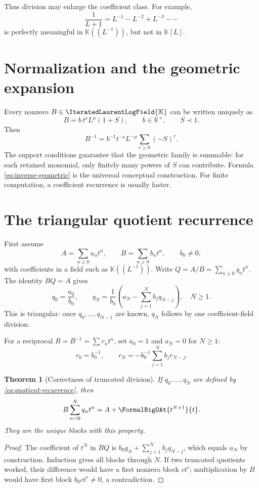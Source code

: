 \documentclass[11pt,oneside]{book}
\newtheorem{theorem}{Theorem}[chapter]
\theoremstyle{definition}
\theoremstyle{remark}
\newcommand{\K}{\mathbb K}
\newcommand{\PLfield}{\IteratedLaurentLogField{\K}}
\newcommand{\precdom}{\prec}
\begin{document}
Thus division may enlarge the coefficient class.  For example,
\[
 \frac1{L+1}=L^{-1}-L^{-2}+L^{-3}-\cdots
\]
is perfectly meaningful in $\K((L^{-1}))$, but not in $\K[L]$.

\section{Normalization and the geometric expansion}
Every nonzero $B\in\PLfield$ can be written uniquely as
\begin{equation}\label{eq:division-normalization}
 B=b\,t^\nu L^\mu(1+S),
 \qquad b\in\K^\times,
 \qquad S\precdom1.
\end{equation}
Then
\begin{equation}\label{eq:inverse-geometric}
 B^{-1}=b^{-1}t^{-\nu}L^{-\mu}
 \sum_{r\ge0}(-S)^r.
\end{equation}
The support conditions guarantee that the geometric family is summable: for
each retained monomial, only finitely many powers of $S$ can contribute.
Formula \eqref{eq:inverse-geometric} is the universal conceptual construction.
For finite computation, a coefficient recurrence is usually faster.

\section{The triangular quotient recurrence}
First assume
\begin{equation}\label{eq:quotient-normalized}
 A=\sum_{n\ge0}a_n t^n,
 \qquad
 B=\sum_{n\ge0}b_n t^n,
 \qquad b_0\ne0,
\end{equation}
with coefficients in a field such as $\K((L^{-1}))$.  Write
$Q=A/B=\sum_{n\ge0}q_nt^n$.  The identity $BQ=A$ gives
\begin{equation}\label{eq:quotient-recurrence}
 q_0=\frac{a_0}{b_0},
 \qquad
 q_N=\frac{1}{b_0}
 \left(a_N-\sum_{j=1}^{N}b_jq_{N-j}\right),
 \quad N\ge1.
\end{equation}
This is triangular: once $q_0,\ldots,q_{N-1}$ are known, $q_N$ follows by one
coefficient-field division.

For a reciprocal $R=B^{-1}=\sum r_nt^n$, set $a_0=1$ and $a_N=0$ for
$N\ge1$:
\begin{equation}\label{eq:reciprocal-recurrence}
 r_0=b_0^{-1},
 \qquad
 r_N=-b_0^{-1}\sum_{j=1}^{N}b_jr_{N-j}.
\end{equation}

\begin{theorem}[Correctness of truncated division]\label{thm:division-correct}
If $q_0,\ldots,q_N$ are defined by \eqref{eq:quotient-recurrence}, then
\[
 B\sum_{n=0}^{N}q_nt^n
 =A+\FormalBigOAt{t^{N+1}}{t}.
\]
They are the unique blocks with this property.
\end{theorem}
\begin{proof}
The coefficient of $t^N$ in $BQ$ is
$b_0q_N+\sum_{j=1}^Nb_jq_{N-j}$, which equals $a_N$ by construction.
Induction gives all blocks through $N$.  If two truncated quotients worked,
their difference would have a first nonzero block $ct^r$; multiplication by
$B$ would have first block $b_0ct^r\ne0$, a contradiction.
\end{proof}
\end{document}
